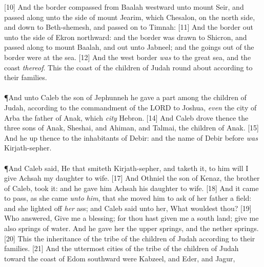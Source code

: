 [10] \textcolor[cmyk]{0.99998,1,0,0}{And the border compassed from Baalah westward unto mount Seir, and passed along unto the side of mount Jearim, which   Chesalon, on the north side, and  down to Beth-shemesh, and passed on to Timnah:}
[11] \textcolor[cmyk]{0.99998,1,0,0}{And the border  out unto the side of Ekron northward: and the border was drawn to Shicron, and passed along to mount Baalah, and  out unto Jabneel; and the goings out of the border were at the sea.}
[12] \textcolor[cmyk]{0.99998,1,0,0}{And the west border \emph{was} to the great sea, and the coast \emph{thereof}. This   the coast of the children of Judah round about according to their families.}\\
\\
\P \textcolor[cmyk]{0.99998,1,0,0}{And unto Caleb the son of Jephunneh he gave a part among the children of Judah, according to the commandment of the LORD to Joshua, \emph{even} the city of Arba the father of Anak, which \emph{city}   Hebron.}
[14] \textcolor[cmyk]{0.99998,1,0,0}{And Caleb drove thence the three sons of Anak, Sheshai, and Ahiman, and Talmai, the children of Anak.}
[15] \textcolor[cmyk]{0.99998,1,0,0}{And he  up thence to the inhabitants of Debir: and the name of Debir before \emph{was} Kirjath-sepher.}\\
\\
\P \textcolor[cmyk]{0.99998,1,0,0}{And Caleb said, He that smiteth Kirjath-sepher, and taketh it, to him will I give Achsah my daughter to wife.}
[17] \textcolor[cmyk]{0.99998,1,0,0}{And Othniel the son of Kenaz, the brother of Caleb, took it: and he gave him Achsah his daughter to wife.}
[18] \textcolor[cmyk]{0.99998,1,0,0}{And it came to pass, as she came \emph{unto} \emph{him}, that she moved him to ask of her father a field: and she lighted off \emph{her} ass; and Caleb said unto her, What wouldest thou?}
[19] \textcolor[cmyk]{0.99998,1,0,0}{Who answered, Give me a blessing; for thou hast given me a south land; give me also springs of water. And he gave her the upper springs, and the nether springs.}
[20] \textcolor[cmyk]{0.99998,1,0,0}{This   the inheritance of the tribe of the children of Judah according to their families.}
[21] \textcolor[cmyk]{0.99998,1,0,0}{And the uttermost cities of the tribe of the children of Judah toward the coast of Edom southward were Kabzeel, and Eder, and Jagur,}
